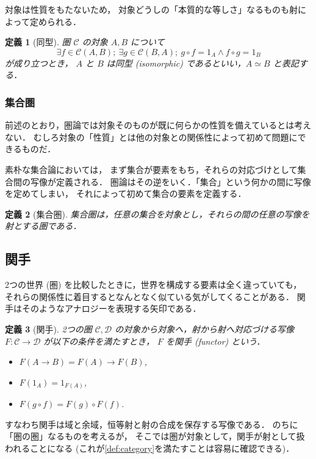\documentclass[titlepage]{ltjsarticle}
\newcommand{\cat}[1]{\mathscr{#1}}
\newcommand{\mrp}[3]{#1(#2,#3)}
\theoremstyle{plain}
\newtheorem{definition}{定義}[section]
\begin{document}
対象は性質をもたないため，
対象どうしの「本質的な等しさ」なるものも射によって定められる．

\begin{definition}[同型]
  圏 $\cat{C}$ の対象 $A,B$ について
  \begin{equation}
    \exists f\in\mrp{\cat{C}}{A}{B};
    \ \exists g\in\mrp{\cat{C}}{B}{A};
    \ g\circ f=1_A\wedge f\circ g=1_B
  \end{equation}
  が成り立つとき，
  $A$ と $B$ は同型 (isomorphic) であるといい，$A\simeq B$ と表記する．
\end{definition}

\subsubsection{集合圏}

前述のとおり，圏論では対象そのものが既に何らかの性質を備えているとは考えない．
むしろ対象の「性質」とは他の対象との関係性によって初めて問題にできるものだ．

素朴な集合論においては，
まず集合が要素をもち，それらの対応づけとして集合間の写像が定義される．
圏論はその逆をいく．「集合」という何かの間に写像を定めてしまい，
それによって初めて集合の要素を定義する．

\begin{definition}[集合圏]
  集合圏は，任意の集合を対象とし，それらの間の任意の写像を射とする圏である．
\end{definition}

\subsection{関手}

2つの世界 (圏) を比較したときに，世界を構成する要素は全く違っていても，
それらの関係性に着目するとなんとなく似ている気がしてくることがある．
関手はそのようなアナロジーを表現する矢印である．
\begin{definition}[関手]
  2つの圏 $\cat{C},\cat{D}$ の対象から対象へ，射から射へ対応づける写像
  $F:\cat{C}\to\cat{D}$ が以下の条件を満たすとき，
  $F$ を関手 (functor) という．
  \begin{itemize}
    \item $F(A\to B)=F(A)\to F(B)$,
    \item $F(1_A)=1_{F(A)}$,
    \item $F(g\circ f)=F(g)\circ F(f)$.
  \end{itemize}
\end{definition}
すなわち関手は域と余域，恒等射と射の合成を保存する写像である．
のちに「圏の圏」なるものを考えるが，
そこでは圏が対象として，関手が射として扱われることになる
(これが\cref{def:category}を満たすことは容易に確認できる)．
\end{document}
